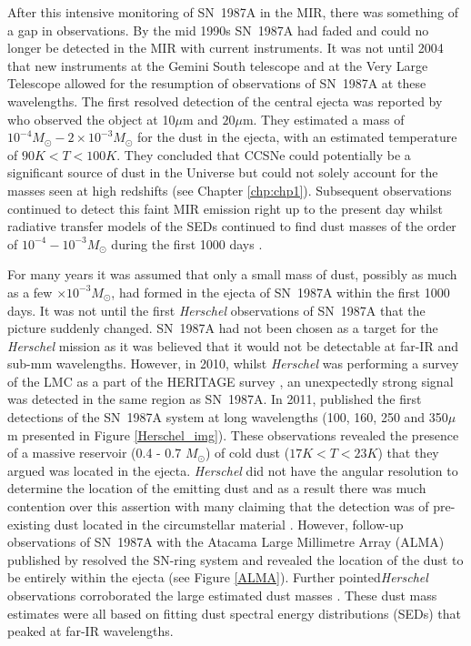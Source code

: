 After this intensive monitoring of SN~1987A in the MIR, there was something of a gap in observations.  By the mid 1990s SN~1987A had faded and could no longer be detected in the MIR with current instruments.  It was not until 2004 that new instruments at the Gemini South telescope and at the Very Large Telescope allowed for the resumption of observations of SN~1987A at these wavelengths.  The first resolved detection of the central ejecta was reported by \citet{Bouchet2004} who observed the object at 10$\mu$m and  $20\mu$m. They estimated a  mass  of $10^{-4}M_{\odot}-2 \times 10^{-3}M_{\odot}$ for the dust in the ejecta, with an estimated temperature of $90K<T<100K$.  They concluded that CCSNe could potentially be a significant source of dust in the Universe but could not solely account for the masses seen at high redshifts (see Chapter \ref{chp:chp1}).  Subsequent observations continued to detect this faint MIR emission right up to the present day \citep{Dwek2010,Bouchet2014} whilst radiative transfer models of the SEDs continued to find dust masses of the order of $10^{-4}-10^{-3}M_{\odot}$ during the first 1000 days \citep{Ercolano2007}.

For many years it was assumed that only a small mass of dust, possibly as much as a few $\times 10^{-3}M_{\odot}$, had formed in the ejecta of SN~1987A within the first 1000 days.  It was not until the first \textit{Herschel} observations of SN~1987A that the picture suddenly changed.  SN~1987A had not been chosen as a target for the \textit{Herschel} mission as it was believed that it would not be detectable at far-IR and sub-mm wavelengths.  However, in 2010, whilst \textit{Herschel} was performing a survey of the LMC as a part of the HERITAGE survey \citep{Meixner2013}, an unexpectedly strong signal was detected in the same region as SN~1987A.  In 2011, \citet{Matsuura2011} published the first detections of the SN~1987A system at long wavelengths (100, 160, 250 and 350$\mu$m presented in Figure \ref{Herschel_img}).  These observations revealed the presence of a massive reservoir (0.4 - 0.7 $M_{\odot}$) of cold dust ($17K<T<23K$) that they argued was located in the ejecta.  \textit{Herschel} did not have the angular resolution to determine the location of the emitting dust and as a result there was much contention over this assertion with many claiming that the detection was of pre-existing dust located in the circumstellar material \citep{Bouchet2014}.  However, follow-up observations of SN~1987A with the Atacama Large Millimetre Array (ALMA) published by \citet{Indebetouw2014} resolved the SN-ring system and revealed the location of the dust to be entirely within the ejecta (see Figure \ref{ALMA}).  Further pointed\textit{Herschel} observations corroborated the large estimated dust masses \citep{Matsuura2015}.  These dust mass estimates were all based on fitting dust spectral energy distributions (SEDs) that peaked at far-IR wavelengths.

